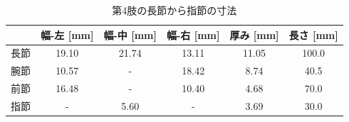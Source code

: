 \begin{table}[t]
  \centering
  \caption{第4肢の長節から指節の寸法}
  \label{tab:4setu}
  \vspace{-3mm}
  \begin{tabular}{|l|c|c|c|c|c|}
  \hline
     & \multicolumn{1}{l|}{幅-左 [mm]} & \multicolumn{1}{l|}{幅-中 [mm]} & \multicolumn{1}{l|}{幅-右 [mm]} & \multicolumn{1}{l|}{厚み [mm]} & \multicolumn{1}{l|}{長さ [mm]} \\ \hline
  長節 & 19.10                       & 21.74                       & 13.11                       & 11.05                       & 100.0                       \\ \hline
  腕節 & 10.57                       & -                           & 18.42                       & 8.74                        & 40.5                        \\ \hline
  前節 & 16.48                       & -                           & 10.40                       & 4.68                        & 70.0                        \\ \hline
  指節 & -                           & 5.60                        & -                           & 3.69                        & 30.0                        \\ \hline
  \end{tabular}
\end{table}
